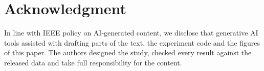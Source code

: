 \documentclass[conference]{IEEEtran}
\begin{document}
\section*{Acknowledgment}
In line with IEEE policy on AI-generated content, we disclose that generative AI tools assisted with drafting parts of the text, the experiment code and the figures of this paper. The authors designed the study, checked every result against the released data and take full responsibility for the content.



\end{document}
